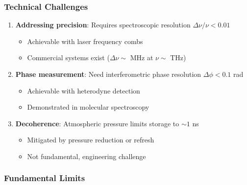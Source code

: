 \subsubsection{Technical Challenges}

\begin{enumerate}
\item \textbf{Addressing precision}: Requires spectroscopic resolution $\Delta\nu/\nu < 0.01$
\begin{itemize}
\item Achievable with laser frequency combs
\item Commercial systems exist ($\Delta\nu \sim$ MHz at $\nu \sim$ THz)
\end{itemize}

\item \textbf{Phase measurement}: Need interferometric phase resolution $\Delta\phi < 0.1$ rad
\begin{itemize}
\item Achievable with heterodyne detection
\item Demonstrated in molecular spectroscopy
\end{itemize}

\item \textbf{Decoherence}: Atmospheric pressure limits storage to $\sim 1$ ns
\begin{itemize}
\item Mitigated by pressure reduction or refresh
\item Not fundamental, engineering challenge
\end{itemize}
\end{enumerate}

\subsubsection{Fundamental Limits}

